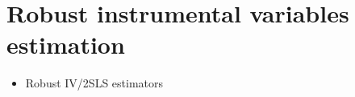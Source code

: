\chapter{Robust instrumental variables estimation}
\label{chap:iv}

\begin{itemize}
\item
    Robust IV/2SLS estimators   %
\end{itemize}


\endinput
